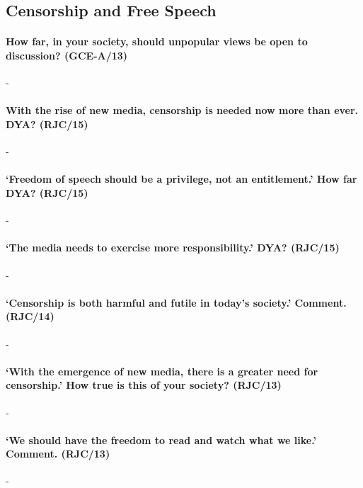 \documentclass[../../main]{subfiles}
\begin{document}
\subsection{Censorship and Free Speech}

\paragraph{How far, in your society, should unpopular views be open to discussion? (GCE-A/13)}-

\paragraph{With the rise of new media, censorship is needed now more than ever. DYA? (RJC/15)}-

\paragraph{`Freedom of speech should be a privilege, not an entitlement.' How far DYA? (RJC/15)}-

\paragraph{`The media needs to exercise more responsibility.' DYA? (RJC/15)}-

\paragraph{`Censorship is both harmful and futile in today's society.' Comment. (RJC/14)}-

\paragraph{`With the emergence of new media, there is a greater need for censorship.' How true is this of your society? (RJC/13)}-

\paragraph{`We should have the freedom to read and watch what we like.' Comment. (RJC/13)}-	
\end{document}
